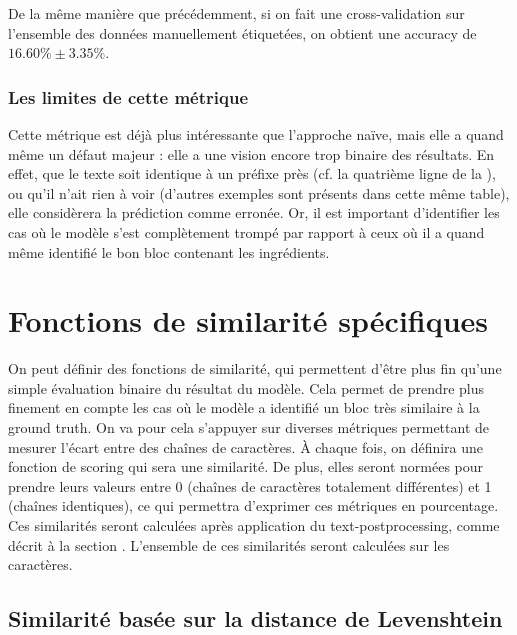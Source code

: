                 De la même manière que précédemment, si on fait une cross-validation sur l'ensemble des données manuellement étiquetées, on obtient une accuracy de $16.60\% \pm 3.35\%$.

                \subsubsection{Les limites de cette métrique}

                Cette métrique est déjà plus intéressante que l'approche naïve, mais elle a quand même un défaut majeur : elle a une vision encore trop binaire des résultats.
                En effet, que le texte soit identique à un préfixe près (cf. la quatrième ligne de la ), ou qu'il n'ait rien à voir (d'autres exemples sont présents dans cette même table), elle considèrera la prédiction comme erronée.
                Or, il est important d'identifier les cas où le modèle s'est complètement trompé par rapport à ceux où il a quand même identifié le bon bloc contenant les ingrédients.

        \section{Fonctions de \og similarité \fg spécifiques}

        On peut définir des fonctions de similarité, qui permettent d'être plus fin qu'une simple évaluation binaire du résultat du modèle.
        Cela permet de prendre plus finement en compte les cas où le modèle a identifié un bloc très similaire à la ground truth.
        On va pour cela s'appuyer sur diverses métriques permettant de mesurer l'écart entre des chaînes de caractères.
        \`{A} chaque fois, on définira une fonction de scoring qui sera une similarité.
        De plus, elles seront normées pour prendre leurs valeurs entre 0 (chaînes de caractères totalement différentes) et 1 (chaînes identiques), ce qui permettra d'exprimer ces métriques en pourcentage.
        Ces similarités seront calculées après application du text-postprocessing, comme décrit à la section .
        L'ensemble de ces similarités seront calculées sur les caractères.

            \subsection{Similarité basée sur la distance de Levenshtein}

